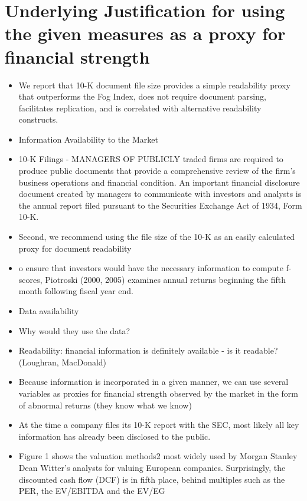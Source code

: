 \documentclass[12pt]{article}
\begin{document}
\section{Underlying Justification for using the given measures as a proxy for financial strength}

    \begin{itemize}
        \item We report that 10-K document file size provides a simple readability proxy that outperforms the Fog Index, does not require document parsing, facilitates replication, and is correlated with alternative readability constructs.\citet{Loughran2014}
        \item Information Availability to the Market
        \item 10-K Filings - MANAGERS OF PUBLICLY traded firms are required to produce public documents
        that provide a comprehensive review of the firm’s business operations and financial condition. An important financial disclosure document created by managers to communicate with investors and analysts is the annual report filed pursuant to the Securities Exchange Act of 1934, Form 10-K.\citet{Loughran2014}
        \item Second, we recommend using the file size of the 10-K as an easily calculated proxy for document readability \citet{Loughran2014}
        \item o ensure that investors would have the necessary information to compute f-scores, Piotroski (2000, 2005) examines annual returns beginning the fifth month following fiscal year end. \citet{Choi2012}
        \item Data availability
        \item Why would they use the data?
        \item Readability: financial information is definitely available - is it readable? (Loughran, MacDonald)
        \item Because information is incorporated in a given manner, we can use several variables as proxies for financial strength observed by the market in the form of abnormal returns (they know what we know)
        \item At the time a company files its 10-K report with the SEC, most likely all key information has already been disclosed to the public.\citet{You2009}
        \item Figure 1 shows the valuation methods2 most widely used by Morgan Stanley Dean Witter’s
        analysts for valuing European companies. Surprisingly, the discounted cash flow (DCF) is in fifth place, behind multiples such as the PER, the EV/EBITDA and the EV/EG \citet{Fernandez2001}
    \end{itemize}
\end{document}
